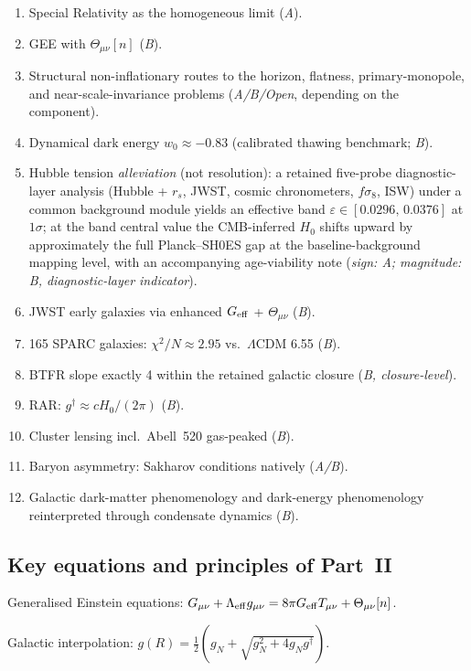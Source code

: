 \documentclass[11pt,a4paper]{article}
\begin{document}
\begin{enumerate}
\item Special Relativity as the homogeneous limit (\emph{A}).
\item GEE with $\Theta_{\mu\nu}[n]$ (\emph{B}).
\item Structural non-inflationary routes to the horizon, flatness, primary-monopole, and near-scale-invariance problems (\emph{A/B/Open}, depending on the component).
\item Dynamical dark energy $w_0 \approx -0.83$ (calibrated thawing benchmark; \emph{B}).
\item Hubble tension \emph{alleviation} (not resolution): a retained five-probe diagnostic-layer analysis (Hubble + $r_s$, JWST, cosmic chronometers, $f\sigma_8$, ISW) under a common background module yields an effective band $\varepsilon \in [0.0296,\,0.0376]$ at $1\sigma$; at the band central value the CMB-inferred $H_0$ shifts upward by approximately the full Planck--SH0ES gap at the baseline-background mapping level, with an accompanying age-viability note (\emph{sign: A; magnitude: B, diagnostic-layer indicator}).
\item JWST early galaxies via enhanced $G_{\rm eff}$ + $\Theta_{\mu\nu}$ (\emph{B}).
\item 165 SPARC galaxies: $\chi^2/N \approx 2.95$ vs.\ $\Lambda$CDM 6.55 (\emph{B}).
\item BTFR slope exactly 4 within the retained galactic closure (\emph{B, closure-level}).
\item RAR: $g^\dagger \approx cH_0/(2\pi)$ (\emph{B}).
\item Cluster lensing incl.\ Abell~520 gas-peaked (\emph{B}).
\item Baryon asymmetry: Sakharov conditions natively (\emph{A/B}).
\item Galactic dark-matter phenomenology and dark-energy phenomenology reinterpreted through condensate dynamics (\emph{B}).
\end{enumerate}

\subsection{Key equations and principles of Part~II}

Generalised Einstein equations: $G_{\mu\nu} + \Lambda_{\rm eff}g_{\mu\nu} = 8\pi G_{\rm eff}T_{\mu\nu} + \Theta_{\mu\nu}[n]$.

Galactic interpolation: $g(R) = \frac{1}{2}(g_N + \sqrt{g_N^2 + 4g_Ng^\dagger})$.
\end{document}
